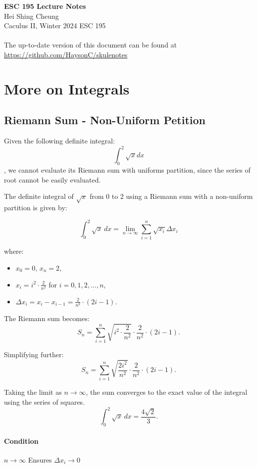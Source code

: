 \documentclass[11pt]{article}
\begin{document}
\thispagestyle{empty}
{\LARGE \bf ESC 195 Lecture Notes}\\
{\large Hei Shing Cheung}\\
Caculus II, Winter 2024 \hfill ESC 195\\
\\
The up-to-date version of this document can be found at \url{https://github.com/HaysonC/skulenotes}\\

\section{More on Integrals}
\subsection{Riemann Sum - Non-Uniform Petition}
\begin{example}
    Given the following definite integral:
    $$\int^2_0 \sqrt{x} dx$$, we cannot evaluate its Riemann sum with uniforms partition, since the series of root cannot be easily evaluated. 
\end{example}

The definite integral of $\sqrt{x}$ from $0$ to $2$ using a Riemann sum with a non-uniform partition is given by:

$$
\int_{0}^{2} \sqrt{x} \, dx = \lim_{n \to \infty} \sum_{i=1}^n \sqrt{x_i} \Delta x_i
$$

where:
\begin{itemize}
    \item $x_0 = 0, \, x_n = 2$,
    \item $x_i = i^2 \cdot \frac{2}{n^2}$ for $i = 0, 1, 2, \dots, n$,
    \item $\Delta x_i = x_i - x_{i-1} = \frac{2}{n^2} \cdot (2i - 1)$.
\end{itemize}

The Riemann sum becomes:
$$
S_n = \sum_{i=1}^n \sqrt{i^2 \cdot \frac{2}{n^2}} \cdot \frac{2}{n^2} \cdot (2i - 1).
$$

Simplifying further:
$$
S_n = \sum_{i=1}^n \sqrt{\frac{2i^2}{n^2}} \cdot \frac{2}{n^2} \cdot (2i - 1).
$$

Taking the limit as $n \to \infty$, the sum converges to the exact value of the integral using the series of squares. 
$$
\int_{0}^{2} \sqrt{x} \, dx = \frac{4\sqrt{2}}{3}.
$$
\paragraph{Condition} $n \to \infty$ Ensures $\Delta x_i \to 0$
\end{document}
